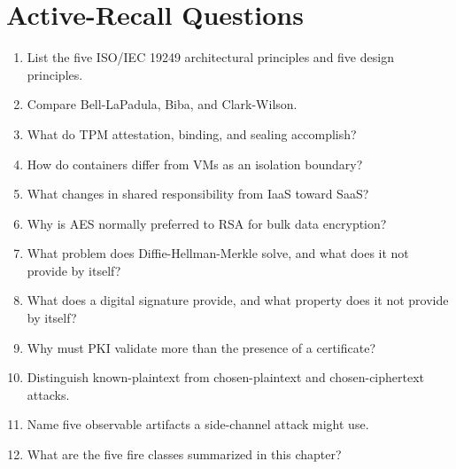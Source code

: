 \documentclass[10pt,letterpaper]{article}
\begin{document}
\section{Active-Recall Questions}
\begin{enumerate}
\item List the five ISO/IEC 19249 architectural principles and five design principles.
\item Compare Bell-LaPadula, Biba, and Clark-Wilson.
\item What do TPM attestation, binding, and sealing accomplish?
\item How do containers differ from VMs as an isolation boundary?
\item What changes in shared responsibility from IaaS toward SaaS?
\item Why is AES normally preferred to RSA for bulk data encryption?
\item What problem does Diffie-Hellman-Merkle solve, and what does it not provide by itself?
\item What does a digital signature provide, and what property does it not provide by itself?
\item Why must PKI validate more than the presence of a certificate?
\item Distinguish known-plaintext from chosen-plaintext and chosen-ciphertext attacks.
\item Name five observable artifacts a side-channel attack might use.
\item What are the five fire classes summarized in this chapter?
\end{enumerate}
\end{document}

